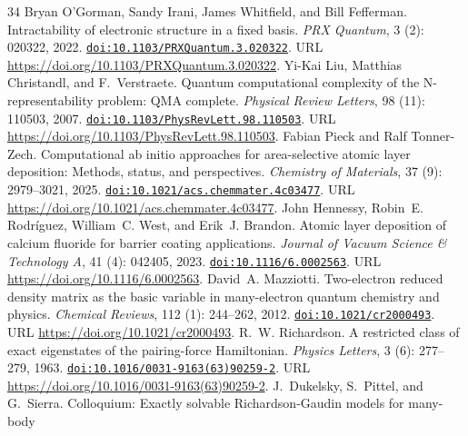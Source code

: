 \documentclass[11pt,a4paper]{article}
\theoremstyle{plain}
\theoremstyle{definition}
\theoremstyle{remark}
\providecommand{\doi}[1]{\href{https://doi.org/#1}{\texttt{doi:#1}}}
\begin{document}
\begin{thebibliography}{34}
Bryan O'Gorman, Sandy Irani, James Whitfield, and Bill Fefferman.
\newblock Intractability of electronic structure in a fixed basis.
\newblock \emph{PRX Quantum}, 3 (2): 020322, 2022.
\newblock \doi{10.1103/PRXQuantum.3.020322}.
\newblock URL \url{https://doi.org/10.1103/PRXQuantum.3.020322}.
Yi-Kai Liu, Matthias Christandl, and F.~Verstraete.
\newblock Quantum computational complexity of the {N}-representability problem:
  {QMA} complete.
\newblock \emph{Physical Review Letters}, 98 (11): 110503,
  2007.
\newblock \doi{10.1103/PhysRevLett.98.110503}.
\newblock URL \url{https://doi.org/10.1103/PhysRevLett.98.110503}.
Fabian Pieck and Ralf Tonner-Zech.
\newblock Computational ab initio approaches for area-selective atomic layer
  deposition: Methods, status, and perspectives.
\newblock \emph{Chemistry of Materials}, 37 (9): 2979--3021,
  2025.
\newblock \doi{10.1021/acs.chemmater.4c03477}.
\newblock URL \url{https://doi.org/10.1021/acs.chemmater.4c03477}.
John Hennessy, Robin~E. Rodríguez, William~C. West, and Erik~J. Brandon.
\newblock Atomic layer deposition of calcium fluoride for barrier coating
  applications.
\newblock \emph{Journal of Vacuum Science \& Technology A}, 41
  (4): 042405, 2023.
\newblock \doi{10.1116/6.0002563}.
\newblock URL \url{https://doi.org/10.1116/6.0002563}.
David~A. Mazziotti.
\newblock Two-electron reduced density matrix as the basic variable in
  many-electron quantum chemistry and physics.
\newblock \emph{Chemical Reviews}, 112 (1): 244--262, 2012.
\newblock \doi{10.1021/cr2000493}.
\newblock URL \url{https://doi.org/10.1021/cr2000493}.
R.~W. Richardson.
\newblock A restricted class of exact eigenstates of the pairing-force
  {Hamiltonian}.
\newblock \emph{Physics Letters}, 3 (6): 277--279, 1963.
\newblock \doi{10.1016/0031-9163(63)90259-2}.
\newblock URL \url{https://doi.org/10.1016/0031-9163(63)90259-2}.
J.~Dukelsky, S.~Pittel, and G.~Sierra.
\newblock Colloquium: Exactly solvable {Richardson-Gaudin} models for many-body

\end{thebibliography}
\end{document}
